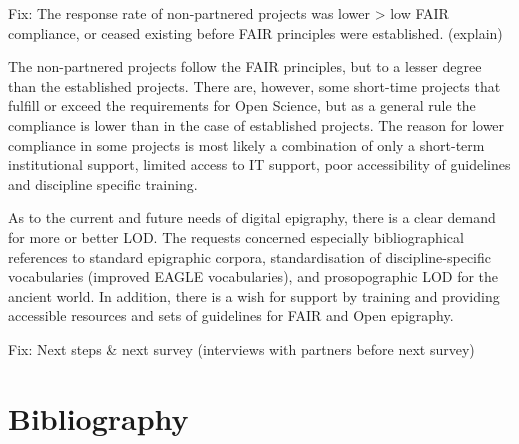 \documentclass[
  12pt,
]{scrreprt}
\begin{document}
Fix: The response rate of non-partnered projects was lower
\textgreater{} low FAIR compliance, or ceased existing before FAIR
principles were established. (explain)

The non-partnered projects follow the FAIR principles, but to a lesser
degree than the established projects. There are, however, some
short-time projects that fulfill or exceed the requirements for Open
Science, but as a general rule the compliance is lower than in the case
of established projects. The reason for lower compliance in some
projects is most likely a combination of only a short-term institutional
support, limited access to IT support, poor accessibility of guidelines
and discipline specific training.

As to the current and future needs of digital epigraphy, there is a
clear demand for more or better LOD. The requests concerned especially
bibliographical references to standard epigraphic corpora,
standardisation of discipline-specific vocabularies (improved EAGLE
vocabularies), and prosopographic LOD for the ancient world. In
addition, there is a wish for support by training and providing
accessible resources and sets of guidelines for FAIR and Open epigraphy.

Fix: Next steps \& next survey (interviews with partners before next
survey)

\hypertarget{bibliography}{%
\chapter{Bibliography}\label{bibliography}}
\end{document}
